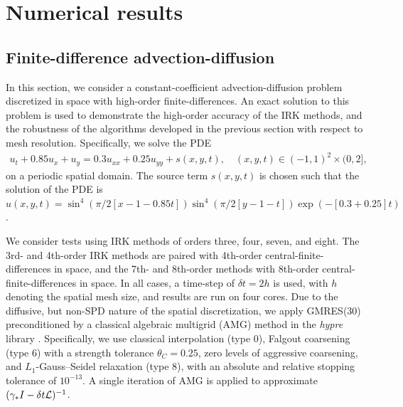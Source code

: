 \documentclass[a4paper,10pt]{article}
\begin{document}
\section{Numerical results}\label{sec:numerics}

\subsection{Finite-difference advection-diffusion}\label{sec:numerics:fd}

In this section, we consider a constant-coefficient advection-diffusion problem
discretized in space with high-order finite-differences. An exact solution to
this problem is used to demonstrate the high-order accuracy of the IRK methods,
and the robustness of the algorithms developed in the previous section with
respect to mesh resolution. Specifically, we solve the PDE
%
\begin{align}
\label{eq:FD_ex} u_t + 0.85 u_x + u_y = 0.3 u_{xx} + 0.25 u_{yy} + s(x,y,t),
\quad (x,y,t) \in (-1,1)^2 \times (0,2],
\end{align}
%
on a periodic spatial domain. The source term $s(x,y,t)$ is chosen such that
the solution of the PDE is
$u(x,y,t)=\sin^4(\pi/2[x-1-0.85t]) \sin^4(\pi/2 [y-1-t]) \exp(-[0.3+0.25]t)$.

We consider tests using IRK methods of orders three, four, seven, and eight. The
3rd- and 4th-order IRK methods are paired with 4th-order
central-finite-differences in space, and the 7th- and 8th-order methods with
8th-order central-finite-differences in space. In all cases, a time-step of
$\delta t = 2 h$ is used, with $h$ denoting the spatial mesh size, and results
are run on four cores. Due to the
diffusive, but non-SPD nature of the spatial discretization, we apply GMRES(30)
preconditioned by a classical algebraic multigrid (AMG) method in the
\textit{hypre} library \cite{Falgout:2002vu}. Specifically, we
use classical interpolation (type 0), Falgout coarsening (type 6) with a strength
tolerance $\theta_C = 0.25$, zero levels of aggressive coarsening, and
$L_1$-Gauss--Seidel relaxation (type 8), with an absolute and relative stopping
tolerance of $10^{-13}$. A single iteration of AMG is applied to approximate
$(\gamma_* I - \delta t {\cal L})^{-1}$.
\end{document}
